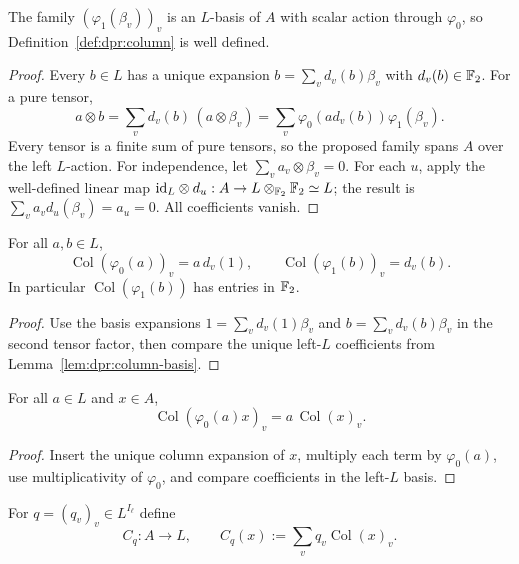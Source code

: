\begin{lemma}\label{lem:dpr:column-basis}
The family $(\varphi_1(\beta_v))_v$
is an $L$-basis of $A$ with scalar action
through $\varphi_0$, so
Definition~\ref{def:dpr:column} is well defined.
\end{lemma}
\begin{proof}
Every $b\in L$ has a unique expansion
$b=\sum_vd_v(b)\beta_v$ with
$d_v(b)\in\mathbb{F}_2$. For a pure tensor,
\[
 a\otimes b
 =\sum_vd_v(b)\,(a\otimes\beta_v)
 =\sum_v\varphi_0(ad_v(b))\varphi_1(\beta_v).
\]
Every tensor is a finite sum of pure tensors,
so the proposed family spans $A$ over the
left $L$-action.
For independence, let
$\sum_va_v\otimes\beta_v=0$.
For each $u$, apply the well-defined
linear map $\mathrm{id}_L\otimes d_u:A\to
L\otimes_{\mathbb{F}_2}\mathbb{F}_2\simeq L$;
the result is
$\sum_va_vd_u(\beta_v)=a_u=0$.
All coefficients vanish.
\end{proof}

\begin{lemma}\label{lem:dpr:embedding-columns}
For all $a,b\in L$,
\[
 \operatorname{Col}(\varphi_0(a))_v=a\,d_v(1),
 \qquad
 \operatorname{Col}(\varphi_1(b))_v=d_v(b).
\]
In particular
$\operatorname{Col}(\varphi_1(b))$
has entries in $\mathbb{F}_2$.
\end{lemma}
\begin{proof}
Use the basis expansions
$1=\sum_vd_v(1)\beta_v$ and
$b=\sum_vd_v(b)\beta_v$
in the second tensor factor,
then compare the unique
left-$L$ coefficients from
Lemma~\ref{lem:dpr:column-basis}.
\end{proof}

\begin{lemma}\label{lem:dpr:column-scaling}
For all $a\in L$ and $x\in A$,
\[
 \operatorname{Col}(\varphi_0(a)x)_v
  =a\,\operatorname{Col}(x)_v.
\]
\end{lemma}
\begin{proof}
Insert the unique column expansion of
$x$, multiply each term by
$\varphi_0(a)$, use multiplicativity
of $\varphi_0$, and compare coefficients
in the left-$L$ basis.
\end{proof}

\begin{definition}\label{def:dpr:contraction}
For $q=(q_v)_v\in L^{I_\ell}$ define
\[
 C_q:A\to L,\qquad
 C_q(x):=\sum_vq_v\operatorname{Col}(x)_v.
\]
\end{definition}


